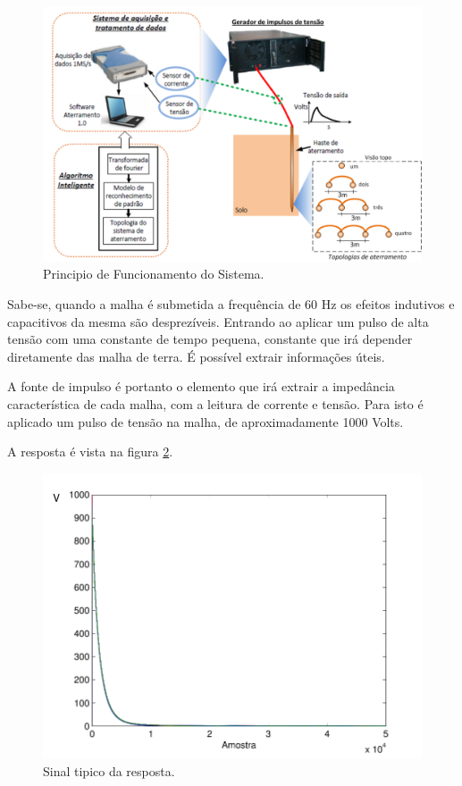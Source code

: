 \documentclass[a4paper, 10pt]{article}
\begin{document}
\begin{figure}[!h]
        \caption{\label{fig_principio_funcionamento}Principio de Funcionamento do Sistema.}
	    \begin{center}
            \includegraphics[scale=0.3]{../fotos/principio/principio_de_funcionamento_corte.pdf}
	    \end{center}
\end{figure}

Sabe-se, quando a malha é submetida a frequência de 60 Hz os efeitos indutivos e 
capacitivos da mesma são desprezíveis. Entrando ao aplicar um pulso de 
alta tensão com uma constante de tempo pequena, constante que irá 
depender diretamente das malha de terra. É possível extrair informações
úteis. 

A fonte de impulso é portanto o elemento que irá extrair a impedância
característica de cada malha, com a leitura de corrente e tensão. 
Para isto é aplicado um pulso de tensão na malha, de aproximadamente
1000 Volts. 

A resposta é vista na figura \ref{fig_sinal}. 

\begin{figure}[!h]
    \caption{\label{fig_sinal} Sinal tipico da resposta.}
	    \begin{center}
            \includegraphics[scale=0.5]{../fotos/sinal/sinal-eps-converted-to.pdf}
	    \end{center}
\end{figure}
\end{document}

